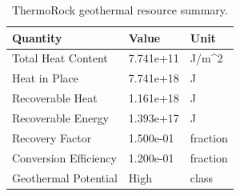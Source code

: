 \begin{table}
\centering
\caption{ThermoRock geothermal resource summary.}
\label{tab:geothermal\_summary}
\begin{tabular}{lll}
\hline
Quantity & Value & Unit \\
\hline
Total Heat Content & 7.741e+11 & J/m\textasciicircum{}2 \\
Heat in Place & 7.741e+18 & J \\
Recoverable Heat & 1.161e+18 & J \\
Recoverable Energy & 1.393e+17 & J \\
Recovery Factor & 1.500e-01 & fraction \\
Conversion Efficiency & 1.200e-01 & fraction \\
Geothermal Potential & High & class \\
\hline
\end{tabular}
\end{table}
